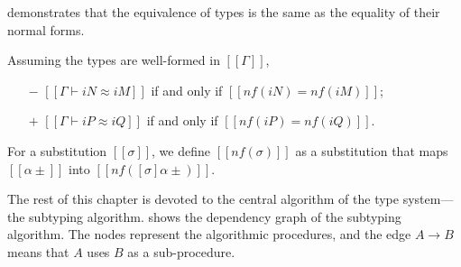 \documentclass[acmsmall,natbib=false,review,anonymous]{acmart}
\begin{document}
demonstrates that the equivalence of types is the same
as the equality of their normal forms.
\begin{theorempreview}
  Assuming the types are well-formed in $[[Γ]]$, 
  \begin{itemize}
    \item [$-$] $[[Γ ⊢ iN ≈ iM]]$ if and only if $[[nf(iN) = nf(iM)]]$;
    \item [$+$] $[[Γ ⊢ iP ≈ iQ]]$ if and only if $[[nf(iP) = nf(iQ)]]$.
  \end{itemize}
\end{theorempreview}


\begin{algorithm}
  For a substitution $[[σ]]$, we define $[[nf(σ)]]$
  as a substitution that maps $[[α±]]$ into $[[nf([σ]α±)]]$.
\end{algorithm}

The rest of this chapter is devoted to the
central algorithm of the type system---the subtyping algorithm. 
 shows the dependency graph of the subtyping algorithm.
The nodes represent the algorithmic procedures, and the edge $A \to B$ means that 
$A$ uses $B$ as a sub-procedure.
\end{document}
